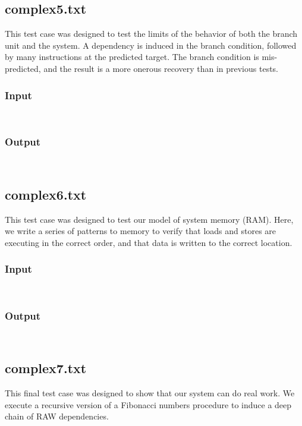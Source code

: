 \documentclass[12pt]{article}
\begin{document}
\subsection{complex5.txt}
This test case was designed to test the limits of the behavior of both the branch unit and the system.  A dependency is induced in the branch condition, followed by many instructions at the predicted target.  The branch condition is mis-predicted, and the result is a more onerous recovery than in previous tests.  

\subsubsection*{Input}
\begin{verbatim}
    
\end{verbatim}

\subsubsection*{Output}
\begin{verbatim}
    
\end{verbatim}

\subsection{complex6.txt}
This test case was designed to test our model of system memory (RAM).  Here, we write a series of patterns to memory to verify that loads and stores are executing in the correct order, and that data is written to the correct location.

\subsubsection*{Input}
\begin{verbatim}
    
\end{verbatim}

\subsubsection*{Output}
\begin{verbatim}
    
\end{verbatim}

\subsection{complex7.txt}
This final test case was designed to show that our system can do real work.  We execute a recursive version of a Fibonacci numbers procedure to induce a deep chain of RAW dependencies.
\end{document}
